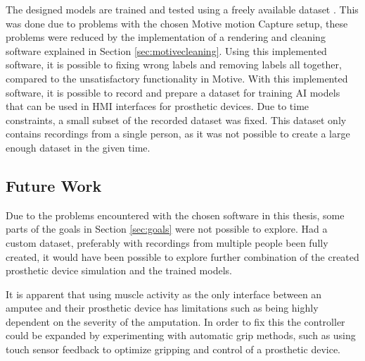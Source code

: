 \documentclass[../main.tex]{subfiles}
\begin{document}
The designed models are trained and tested using a freely available dataset \cite{kinmusdataset}.
This was done due to problems with the chosen Motive motion Capture \cite{motive} setup, these problems were reduced by the implementation of a rendering and cleaning software explained in Section \ref{sec:motivecleaning}.
Using this implemented software, it is possible to fixing wrong labels and removing labels all together, compared to the unsatisfactory functionality in Motive.
With this implemented software, it is possible to record and prepare a dataset for training AI models that can be used in HMI interfaces for prosthetic devices.
Due to time constraints, a small subset of the recorded dataset was fixed.
This dataset only contains recordings from a single person, as it was not possible to create a large enough dataset in the given time. 





\newpage
\subsection{Future Work}

Due to the problems encountered with the chosen software in this thesis, some parts of the goals in Section \ref{sec:goals} were not possible to explore.
Had a custom dataset, preferably with recordings from multiple people been fully created, it would have been possible to explore further combination of the created prosthetic device simulation and the trained models.

It is apparent that using muscle activity as the only interface between an amputee and their prosthetic device has limitations such as being highly dependent on the severity of the amputation.
In order to fix this the controller could be expanded by experimenting with automatic grip methods, such as using touch sensor feedback to optimize gripping and control of a prosthetic device.
\end{document}
